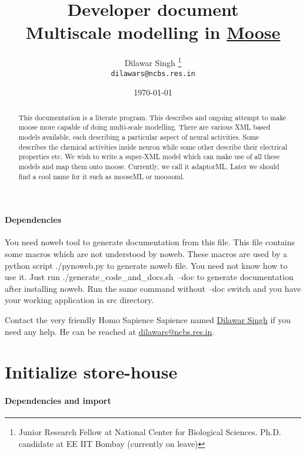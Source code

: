 \documentclass[]{article}%
\title{\textbf{Developer document} \\
Multiscale modelling in \href{www.moose.ncbs.res.in}{Moose}}
\author{Dilawar Singh \footnote{Junior Research Fellow at National Center for
Biological Sciences. Ph.D. candidate at EE IIT Bombay (currently on leave)} \\
\texttt{dilawars@ncbs.res.in}}
\date{\today}
\begin{document}
\maketitle

\begin{abstract}
\label{abstract}

  This documentation is a literate program. This describes and ongoing attempt
  to make moose more capable of doing multi-scale modelling. There are various
  XML based models available, each describing a particular aspect of neural
  activities. Some describes the chemical activities inside neuron while some
  other describe their electrical properties etc. We wish to write a super-XML
  model which can make use of all these models and map them onto moose.
  Currently, we call it {\Tt{}adaptorML\nwendquote}. Later we should find a cool name for it
  such as {\Tt{}mooseML\nwendquote} or {\Tt{}mooooml\nwendquote}.

\end{abstract}

\paragraph{Dependencies}

  You need {\Tt{}noweb\nwendquote} tool to generate documentation from this file. This file
  contains some macros which are not understood by {\Tt{}noweb\nwendquote}. These macros are
  used by a python script {\Tt{}./pynoweb.py\nwendquote} to generate {\Tt{}noweb\nwendquote} file. You need
  not know how to use it. Just run {\Tt{}./generate{\_}code{\_}and{\_}docs.sh\ --doc\nwendquote} to
  generate documentation after installing {\Tt{}noweb\nwendquote}.  Run the same command
  without {\Tt{}--doc\nwendquote} switch and you have your working application in {\Tt{}src\nwendquote}
  directory. 
  
  Contact the very friendly Homo Sapience Sapience named
  \href{mailto:dilawars@ncbs.res.in}{Dilawar Singh} if you need any help.
  He can be reached at \url{dilawars@ncbs.res.in}.

\section{Initialize store-house}
\label{sec:setup}

\paragraph{Dependencies and import}
\end{document}
